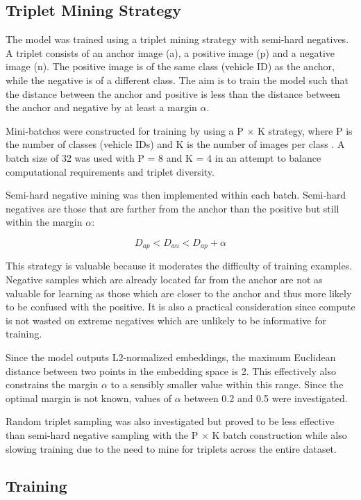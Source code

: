 \documentclass{article}
\theoremstyle{plain}
\theoremstyle{definition}
\theoremstyle{remark}
\begin{document}
\subsection{Triplet Mining Strategy}

The model was trained using a triplet mining strategy with semi-hard negatives. 
A triplet consists of an anchor image (a), a positive image (p) and a negative 
image (n). The positive image is of the same class (vehicle ID) as the anchor, 
while the negative is of a different class. The aim is to train the model such 
that the distance between the anchor and positive is less than the distance 
between the anchor and negative by at least a margin $\alpha$. 

Mini-batches were constructed for training by using a P $\times$ K strategy, 
where P is the number of classes (vehicle IDs) and K is the number of images 
per class \cite{Brink26}. A batch size of 32 was used with P = 8 and K = 4 in an 
attempt to balance computational requirements and triplet diversity.

Semi-hard negative mining was then implemented within each batch. Semi-hard 
negatives are those that are farther from the anchor than the positive but still
within the margin $\alpha$: 

$$
    D_{ap} < D_{an} < D_{ap} + \alpha
$$

This strategy is valuable because it moderates the difficulty of training 
examples. Negative samples which are already located far from the anchor are not
as valuable for learning as those which are closer to the anchor and thus 
more likely to be confused with the positive. It is also a practical 
consideration since compute is not wasted on extreme negatives which are 
unlikely to be informative for training. 

Since the model outputs L2-normalized embeddings, the maximum Euclidean distance 
between two points in the embedding space is 2. This effectively also constrains
the margin $\alpha$ to a sensibly smaller value within this range. Since the 
optimal margin is not known, values of $\alpha$ between 0.2 and 0.5 were 
investigated.

Random triplet sampling was also investigated but proved to be less effective 
than semi-hard negative sampling with the P $\times$ K batch construction while 
also slowing training due to the need to mine for triplets across the entire 
dataset. 

\subsection{Training}
\end{document}
